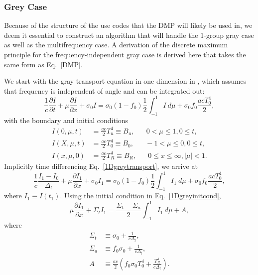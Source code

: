 \subsubsection{Grey Case}
Because of the structure of the use codes that the DMP will likely be used in,
we deem it essential to construct an algorithm that will handle the 1-group gray
case as well as the multifrequency case.  A derivation of the discrete maximum 
principle for the frequency-independent gray case is derived here that takes
the same form as Eq.\ \eqref{DMP}.

We start with the gray transport equation in one dimension in \cite{FleckCumm},
which assumes that frequency is independent of angle and can be integrated out:
\begin{equation}
\frac{1}{c}\frac{\partial I}{\partial t} + \mu\frac{\partial I}{\partial x} +
  \sigma_0 I = \sigma_0(1-f_0)\frac{1}{2}\int_{-1}^1 I\ d\mu + \sigma_0f_0
  \frac{acT_0^4}{2},
  \label{1Dgreytransport}
\end{equation}
with the boundary and initial conditions
\begin{align}
I(0,\mu,t)&=\frac{ac}{2}T_u^4\equiv B_u,\hspace{20pt}0<\mu\leq1, 0\leq t,\\
I(X,\mu,t)&=\frac{ac}{2}T_0^4\equiv B_0,\hspace{20pt}-1<\mu\leq0, 0\leq t,\\
I(x,\mu,0)&=\frac{ac}{2}T_R^4\equiv B_R,\hspace{20pt}0\leq x\leq\infty, |\mu|<1.
  \label{1Dgreyinitcond}
\end{align}
Implicitly time differencing Eq.\ \eqref{1Dgreytransport}, we arrive at
\begin{equation}
\frac{1}{c}\frac{I_1-I_0}{\Delta_t}+\mu\frac{\partial I_1}{\partial x} + 
  \sigma_0 I_1 = \sigma_0(1-f_0)\frac{1}{2}\int_{-1}^1I_1\ d\mu + \sigma_0f_0
  \frac{acT_0^4}{2}
  ,\label{1Dgreytimediff}
\end{equation}
where $I_1\equiv I(t_1)$.  Using the initial condition in Eq.\ \eqref{1Dgreyinitcond},
\begin{equation}
\mu\frac{\partial I_1}{\partial x} + \Sigma_tI_1 = \frac{\Sigma_t-\Sigma_a}{2}
  \int_{-1}^1I_1\ d\mu + A,
\end{equation}
where
\begin{align*}
\Sigma_t&\equiv\sigma_0+\frac{1}{c\Delta_t},\\
\Sigma_a&\equiv f_0\sigma_0+\frac{1}{c\Delta_t},\\
A&\equiv\frac{ac}{2}\left(f_0\sigma_0T_0^4 + \frac{T_R^4}{c\Delta_t}\right).
\end{align*}
